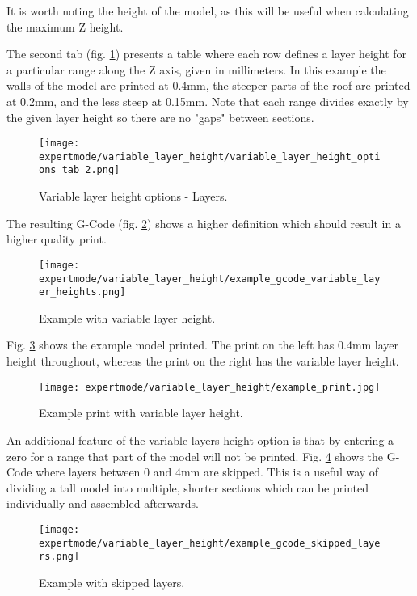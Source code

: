 It is worth noting the height of the model, as this will be useful when calculating the maximum Z height.

The second tab (fig. \ref{fig:variable_layer_height_options_tab_2}) presents a table where each row defines a layer height for a particular range along the Z axis, given in millimeters.  In this example the walls of the model are printed at 0.4mm, the steeper parts of the roof are printed at 0.2mm, and the less steep at 0.15mm.  Note that each range divides exactly by the given layer height so there are no "gaps" between sections.

\begin{figure}[H]
\centering
\texttt{[image: expertmode/variable\_layer\_height/variable\_layer\_height\_options\_tab\_2.png]}
\caption{Variable layer height options - Layers.}
\label{fig:variable_layer_height_options_tab_2}
\end{figure}

The resulting G-Code (fig. \ref{fig:example_gcode_variable_layer_heights}) shows a higher definition which should result in a higher quality print.

\begin{figure}[H]
\centering
\texttt{[image: expertmode/variable\_layer\_height/example\_gcode\_variable\_layer\_heights.png]}
\caption{Example with variable layer height.}
\label{fig:example_gcode_variable_layer_heights}
\end{figure}

Fig. \ref{fig:example_print} shows the example model printed.  The print on the left has 0.4mm layer height throughout, whereas the print on the right has the variable layer height.

\begin{figure}[H]
\centering
\texttt{[image: expertmode/variable\_layer\_height/example\_print.jpg]}
\caption{Example print with variable layer height.}
\label{fig:example_print}
\end{figure}

An additional feature of the variable layers height option is that by entering a zero for a range that part of the model will not be printed.  Fig. \ref{fig:example_gcode_skipped_layers} shows the G-Code where layers between 0 and 4mm are skipped.  This is a useful way of dividing a tall model into multiple, shorter sections which can be printed individually and assembled afterwards.
\begin{figure}[H]
\centering
\texttt{[image: expertmode/variable\_layer\_height/example\_gcode\_skipped\_layers.png]}
\caption{Example with skipped layers.}
\label{fig:example_gcode_skipped_layers}
\end{figure}

